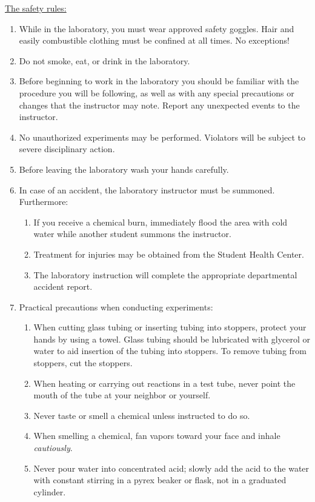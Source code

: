 \documentclass[byrevtex,amssymb,aps,pra,floatfix,letterpaper]{revtex4}
\begin{document}
\noindent
\underline{The safety rules:}
\begin{enumerate}
\item While in the laboratory, you must wear approved safety goggles. Hair and easily combustible clothing must be confined at all times. No exceptions!
\item Do not smoke, eat, or drink in the laboratory.
\item Before beginning to work in the laboratory you should be familiar with the procedure you will be following, as well as with any special precautions or changes that the instructor may note. Report any unexpected events to the instructor.
\item No unauthorized experiments may be performed. Violators will be subject to severe disciplinary action.
\item Before leaving the laboratory wash your hands carefully.
\item In case of an accident, the laboratory instructor must be summoned. Furthermore:
\begin{enumerate}
\item If you receive a chemical burn, immediately flood the area with cold water while another student summons the instructor.
\item Treatment for injuries may be obtained from the Student Health Center.
\item The laboratory instruction will complete the appropriate departmental accident report.
\end{enumerate}
\item Practical precautions when conducting experiments:
\begin{enumerate}
\item When cutting glass tubing or inserting tubing into stoppers, protect your hands by using a towel. Glass tubing should be lubricated with glycerol or water to aid insertion of the tubing into stoppers. To remove tubing from stoppers, cut the stoppers.
\item When heating or carrying out reactions in a test tube, never point the mouth of the tube at your neighbor or yourself.
\item Never taste or smell a chemical unless instructed to do so.
\item When smelling a chemical, fan vapors toward your face and inhale \textit{cautiously}.
\item Never pour water into concentrated acid; slowly add the acid to the water with constant stirring in a pyrex beaker or flask, not in a graduated cylinder.

\end{enumerate}
\end{enumerate}
\end{document}
